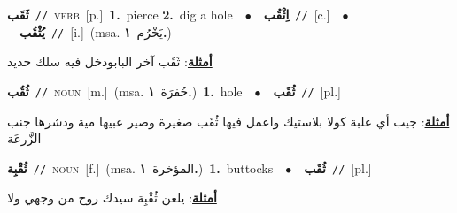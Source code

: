 \documentclass[10pt,a4paper,twoside]{article} %
\begin{document}
\begin{multicols}{2}
{\setlength\topsep{0pt}\textbf{\foreignlanguage{arabic}{ثَقَب}}\ {\color{gray}\texttt{//}\color{black}}\ \textsc{verb}\ [p.]\ \textbf{1.}~pierce  \textbf{2.}~dig a hole\ \ $\bullet$\ \ \setlength\topsep{0pt}\textbf{\foreignlanguage{arabic}{اِثْقُب}}\ {\color{gray}\texttt{//}\color{black}}\ [c.]\ \ $\bullet$\ \ \setlength\topsep{0pt}\textbf{\foreignlanguage{arabic}{يُثْقُب}}\ {\color{gray}\texttt{//}\color{black}}\ [i.]\ \color{gray}(msa. \foreignlanguage{arabic}{يَخْرُم}~\foreignlanguage{arabic}{\textbf{١.}})\color{black}\  \begin{flushright}\color{gray}\foreignlanguage{arabic}{\textbf{\underline{\foreignlanguage{arabic}{أمثلة}}}: ثَقَب آخر البابودخل فيه سلك حديد}\end{flushright}\color{black}} \vspace{2mm}

{\setlength\topsep{0pt}\textbf{\foreignlanguage{arabic}{ثُقُب}}\ {\color{gray}\texttt{//}\color{black}}\ \textsc{noun}\ [m.]\ \color{gray}(msa. \foreignlanguage{arabic}{حُفرَة}~\foreignlanguage{arabic}{\textbf{١.}})\color{black}\ \textbf{1.}~hole\ \ $\bullet$\ \ \setlength\topsep{0pt}\textbf{\foreignlanguage{arabic}{ثُقَب}}\ {\color{gray}\texttt{//}\color{black}}\ [pl.]\  \begin{flushright}\color{gray}\foreignlanguage{arabic}{\textbf{\underline{\foreignlanguage{arabic}{أمثلة}}}: جيب أي علبة كولا بلاستيك واعمل فيها ثُقَب صغيرة وصير عبيها مية ودشرها جنب الزَّرعَة}\end{flushright}\color{black}} \vspace{2mm}

{\setlength\topsep{0pt}\textbf{\foreignlanguage{arabic}{ثُقْبِة}}\ {\color{gray}\texttt{//}\color{black}}\ \textsc{noun}\ [f.]\ \color{gray}(msa. \foreignlanguage{arabic}{المؤخرة}~\foreignlanguage{arabic}{\textbf{١.}})\color{black}\ \textbf{1.}~buttocks\ \ $\bullet$\ \ \setlength\topsep{0pt}\textbf{\foreignlanguage{arabic}{ثُقَب}}\ {\color{gray}\texttt{//}\color{black}}\ [pl.]\  \begin{flushright}\color{gray}\foreignlanguage{arabic}{\textbf{\underline{\foreignlanguage{arabic}{أمثلة}}}: يلعن ثُقْبِة سيدك روح من وجهي ولا}\end{flushright}\color{black}} \vspace{2mm}


\end{multicols}
\end{document}
